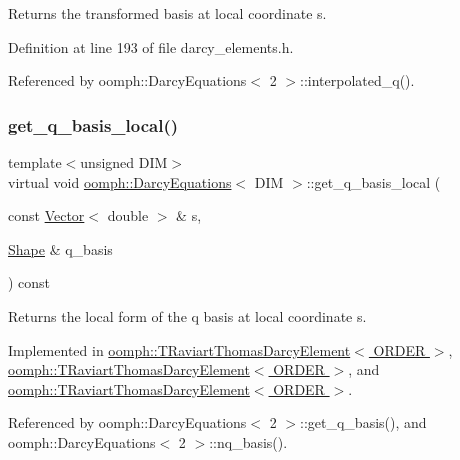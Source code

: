 Returns the transformed basis at local coordinate s. 



Definition at line 193 of file darcy\+\_\+elements.\+h.



Referenced by oomph\+::\+Darcy\+Equations$<$ 2 $>$\+::interpolated\+\_\+q().

\mbox{\label{classoomph_1_1DarcyEquations_ae4098060d7311ceab8ad7673876f070c}} 
\subsubsection{\texorpdfstring{get\+\_\+q\+\_\+basis\+\_\+local()}{get\_q\_basis\_local()}}
{\footnotesize\ttfamily template$<$unsigned D\+IM$>$ \\
virtual void \hyperlink{classoomph_1_1DarcyEquations}{oomph\+::\+Darcy\+Equations}$<$ D\+IM $>$\+::get\+\_\+q\+\_\+basis\+\_\+local (\begin{DoxyParamCaption}\item[{const \hyperlink{classoomph_1_1Vector}{Vector}$<$ double $>$ \&}]{s,  }\item[{\hyperlink{classoomph_1_1Shape}{Shape} \&}]{q\+\_\+basis }\end{DoxyParamCaption}) const\hspace{0.3cm}{\ttfamily [pure virtual]}}



Returns the local form of the q basis at local coordinate s. 



Implemented in \hyperlink{classoomph_1_1TRaviartThomasDarcyElement_a06df8d098318e1ef45259e2f65ed35be}{oomph\+::\+T\+Raviart\+Thomas\+Darcy\+Element$<$ O\+R\+D\+E\+R $>$}, \hyperlink{classoomph_1_1TRaviartThomasDarcyElement_a16c5506831abea90f801a4db7022d6a3}{oomph\+::\+T\+Raviart\+Thomas\+Darcy\+Element$<$ O\+R\+D\+E\+R $>$}, and \hyperlink{classoomph_1_1TRaviartThomasDarcyElement_a4d60f4e499f6fc7a1ec123b019231a14}{oomph\+::\+T\+Raviart\+Thomas\+Darcy\+Element$<$ O\+R\+D\+E\+R $>$}.



Referenced by oomph\+::\+Darcy\+Equations$<$ 2 $>$\+::get\+\_\+q\+\_\+basis(), and oomph\+::\+Darcy\+Equations$<$ 2 $>$\+::nq\+\_\+basis().

